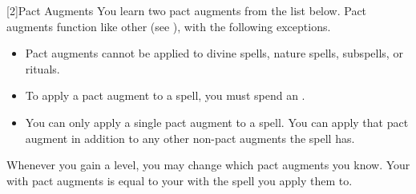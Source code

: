         [2]{Pact Augments} You learn two pact augments from the list below.
        Pact augments function like other  (see ), with the following exceptions.
        \begin{itemize}
            \item Pact augments cannot be applied to divine spells, nature spells, subspells, or rituals.
            \item To apply a pact augment to a spell, you must spend an .
            \item You can only apply a single pact augment to a spell.
                You can apply that pact augment in addition to any other non-pact augments the spell has.
        \end{itemize}
        Whenever you gain a level, you may change which pact augments you know.
        Your  with pact augments is equal to your  with the spell you apply them to.
